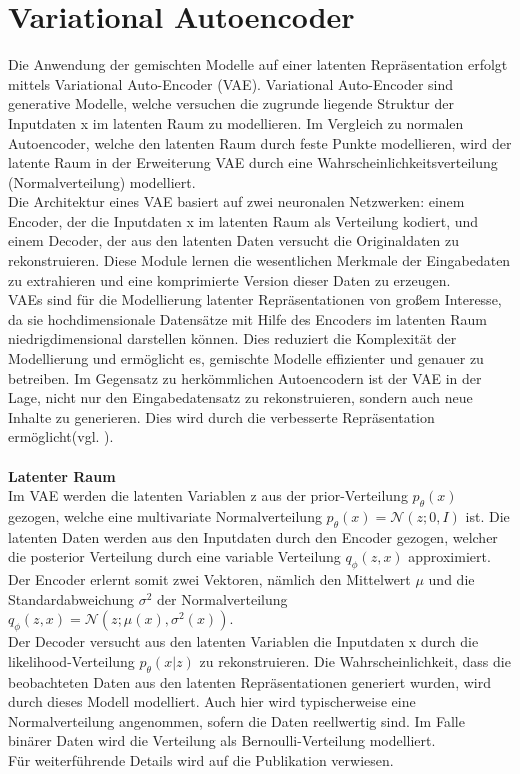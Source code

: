 \documentclass[%
thesis=student,%
coverpage=false,%
titlepage=false,%
headmarks=true, %
german,%
font=libertine, %
math=newpxtx, %
BCOR=5mm,%
coverBCOR=11mm%
]{tumbook}
\theoremstyle{break}
\begin{document}
\section{Variational Autoencoder}
Die Anwendung der gemischten Modelle auf einer latenten Repräsentation erfolgt mittels Variational Auto-Encoder (VAE). Variational Auto-Encoder sind generative Modelle, welche versuchen die zugrunde liegende Struktur der Inputdaten x im latenten Raum zu modellieren. Im Vergleich zu normalen Autoencoder, welche den latenten Raum durch feste Punkte modellieren, wird der latente Raum in der Erweiterung VAE durch eine Wahrscheinlichkeitsverteilung (Normalverteilung) modelliert.\\
Die Architektur eines VAE basiert auf zwei neuronalen Netzwerken: einem Encoder, der die Inputdaten x im latenten Raum als Verteilung kodiert, und einem Decoder, der aus den latenten Daten versucht die Originaldaten zu rekonstruieren. Diese Module lernen die wesentlichen Merkmale der Eingabedaten zu extrahieren und eine komprimierte Version dieser Daten zu erzeugen.\\
VAEs sind für die Modellierung latenter Repräsentationen von großem Interesse, da sie hochdimensionale Datensätze mit Hilfe des Encoders im latenten Raum niedrigdimensional darstellen können. Dies reduziert die Komplexität der Modellierung und ermöglicht es, gemischte Modelle effizienter und genauer zu betreiben. Im Gegensatz zu herkömmlichen Autoencodern ist der VAE in der Lage, nicht nur den Eingabedatensatz zu rekonstruieren, sondern auch neue Inhalte zu generieren. Dies wird durch die verbesserte Repräsentation ermöglicht(vgl. \cite{bigdata-insider-vae}).\\
\\
\textbf{Latenter Raum}\\
Im VAE werden die latenten Variablen z aus der prior-Verteilung $p_\theta(x)$ gezogen, welche eine multivariate Normalverteilung $p_\theta(x) = \mathcal{N}(z;0,I) $ ist. Die latenten Daten werden aus den Inputdaten durch den Encoder  gezogen, welcher die posterior Verteilung durch eine variable Verteilung $q_\phi(z,x)$ approximiert. Der Encoder erlernt somit zwei Vektoren, nämlich den Mittelwert \( \mu \) und die Standardabweichung \( \sigma^2 \) der Normalverteilung $q_\phi(z,x) = \mathcal{N}(z;\mu(x),\sigma^2(x))$.\\
Der Decoder versucht aus den latenten Variablen die Inputdaten x durch die likelihood-Verteilung $p_\theta(x|z)$  zu rekonstruieren. Die  Wahrscheinlichkeit, dass die beobachteten Daten aus den latenten Repräsentationen generiert wurden, wird durch dieses Modell modelliert. Auch hier wird typischerweise eine Normalverteilung angenommen, sofern die  Daten reellwertig sind. Im Falle binärer Daten wird die Verteilung als Bernoulli-Verteilung modelliert. \\ Für weiterführende Details wird auf die Publikation \cite{Auto-EncodingVariationalBayes} verwiesen.\\
\end{document}
